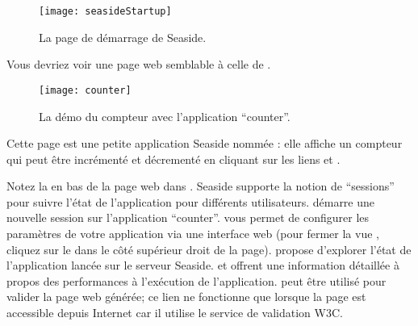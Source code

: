 \documentclass[a4paper,10pt,twoside]{book}
\begin{document}
\begin{figure}[tbh]
\begin{center}
\texttt{[image: seasideStartup]}
\caption{La page de démarrage de Seaside.}
\end{center}
\end{figure}


\noindent
Vous devriez voir une page web semblable à celle de .

\noindent
{}


\begin{figure}[htb]
\begin{center}
\texttt{[image: counter]}
\caption{La démo du compteur avec l'application ``counter''.}
\end{center}
\end{figure}

\noindent
Cette page est une petite application Seaside nommée
: elle affiche un
compteur qui peut être incrémenté et décrementé en cliquant sur les
liens \link{++} et \link{{-}{-}}.

\noindent
{}

Notez la 
 en bas de la page web dans 
 .
Seaside supporte la notion de ``sessions'' pour suivre l'état de
l'application pour différents utilisateurs.
 démarre une nouvelle session sur l'application
``counter''.
 vous permet de 
configurer les paramètres de votre application via une interface
web (pour fermer la vue , cliquez sur le 
dans le côté supérieur droit de la page).
 propose d'explorer l'état de l'application
lancée sur le serveur Seaside.
 et  offrent une information détaillée 
à propos des performances à l'exécution de l'application.
 peut être utilisé pour valider la page web générée;
ce lien ne fonctionne que lorsque la page est accessible depuis
Internet car il utilise le service de validation W3C.
\end{document}
